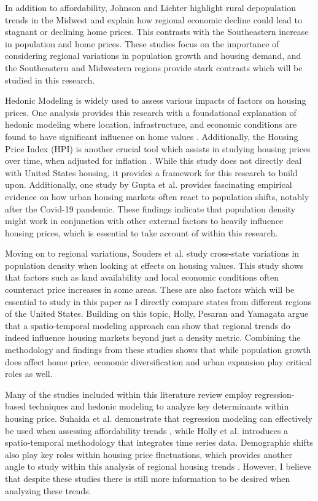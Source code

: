 \documentclass[journal,article,submit,pdftex,moreauthors]{Definitions/mdpi}
\begin{document}
In addition to affordability, Johnson and Lichter \cite{johnson_2019_rural} highlight rural depopulation trends in the Midwest and explain how regional economic decline could lead to stagnant or declining home prices. This contrasts with the Southeastern increase in population and home prices. These studies focus on the importance of considering regional variations in population growth and housing demand, and the Southeastern and Midwestern regions provide stark contrasts which will be studied in this research.

Hedonic Modeling is widely used to assess various impacts of factors on housing prices. One analysis provides this research with a foundational explanation of hedonic modeling where location, infrastructure, and economic conditions are found to have significant influence on home values \citep{sirmans_2005_the}. Additionally, the Housing Price Index (HPI) is another crucial tool which assists in studying housing prices over time, when adjusted for inflation \citep{suhaida_2011_housing}. While this study does not directly deal with United States housing, it provides a framework for this research to build upon. Additionally, one study by Gupta et al. \cite{gupta_2021_flattening} provides fascinating empirical evidence on how urban housing markets often react to population shifts, notably after the Covid-19 pandemic. These findings indicate that population density might work in conjunction with other external factors to heavily influence housing prices, which is essential to take account of within this research.

Moving on to regional variations, Souders et al. \cite{souders_2016_the} study cross-state variations in population density when looking at effects on housing values. This study shows that factors such as land availability and local economic conditions often counteract price increases in some areas. These are also factors which will be essential to study in this paper as I directly compare states from different regions of the United States. Building on this topic, Holly, Pesaran and Yamagata \citep{holly_2010_a} argue that a spatio-temporal modeling approach can show that regional trends do indeed influence housing markets beyond just a density metric. Combining the methodology and findings from these studies shows that while population growth does affect home price, economic diversification and urban expansion play critical roles as well.  

Many of the studies included within this literature review employ regression-based techniques and hedonic modeling to analyze key determinants within housing price. Suhaida et al. \cite{suhaida_2011_housing} demonstrate that regression modeling can effectively be used when assessing affordability trends , while Holly et al. \cite{holly_2010_a} introduces a spatio-temporal methodology that integrates time series data. Demographic shifts also play key roles within housing price fluctuations, which provides another angle to study within this analysis of regional housing trends \citep{johnson_2019_rural}. However, I believe that despite these studies there is still more information to be desired when analyzing these trends.
\end{document}
